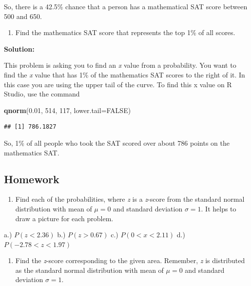 \documentclass[]{book}
\newenvironment{Shaded}{\begin{snugshade}}{\end{snugshade}}
\newcommand{\DataTypeTok}[1]{\textcolor[rgb]{0.13,0.29,0.53}{#1}}
\newcommand{\DecValTok}[1]{\textcolor[rgb]{0.00,0.00,0.81}{#1}}
\newcommand{\FloatTok}[1]{\textcolor[rgb]{0.00,0.00,0.81}{#1}}
\newcommand{\KeywordTok}[1]{\textcolor[rgb]{0.13,0.29,0.53}{\textbf{#1}}}
\newcommand{\NormalTok}[1]{#1}
\newcommand{\OtherTok}[1]{\textcolor[rgb]{0.56,0.35,0.01}{#1}}
\providecommand{\tightlist}{%
  \setlength{\itemsep}{0pt}\setlength{\parskip}{0pt}}
\begin{document}
So, there is a 42.5\% chance that a person has a mathematical SAT score between 500 and 650.

\begin{enumerate}
\def\labelenumi{\alph{enumi}.}
\setcounter{enumi}{4}
\tightlist
\item
  Find the mathematics SAT score that represents the top 1\% of all scores.
\end{enumerate}

\textbf{Solution:}

This problem is asking you to find an \emph{x} value from a probability. You want to find the \emph{x} value that has 1\% of the mathematics SAT scores to the right of it. In this case you are using the upper tail of the curve.
To find this x value on R Studio, use the command

\begin{Shaded}
\begin{Highlighting}[]
\KeywordTok{qnorm}\NormalTok{(}\FloatTok{0.01}\NormalTok{, }\DecValTok{514}\NormalTok{, }\DecValTok{117}\NormalTok{, }\DataTypeTok{lower.tail=}\OtherTok{FALSE}\NormalTok{)}
\end{Highlighting}
\end{Shaded}

\begin{verbatim}
## [1] 786.1827
\end{verbatim}

So, 1\% of all people who took the SAT scored over about 786 points on the mathematics SAT.

\hypertarget{homework-17}{%
\subsection{Homework}\label{homework-17}}

\begin{enumerate}
\def\labelenumi{\arabic{enumi}.}
\tightlist
\item
  Find each of the probabilities, where \emph{z} is a \emph{z}-score from the standard normal distribution with mean of \(\mu=0\) and standard deviation \(\sigma=1\). It helps to draw a picture for each problem.
\end{enumerate}

a.) \(P(z<2.36)\)
b.) \(P(z>0.67)\)
c.) \(P(0<x<2.11)\)
d.) \(P(-2.78<z<1.97)\)

\begin{enumerate}
\def\labelenumi{\arabic{enumi}.}
\setcounter{enumi}{1}
\tightlist
\item
  Find the \emph{z}-score corresponding to the given area. Remember, \emph{z} is distributed as the standard normal distribution with mean of \(\mu=0\) and standard deviation \(\sigma=1\).
\end{enumerate}
\end{document}
